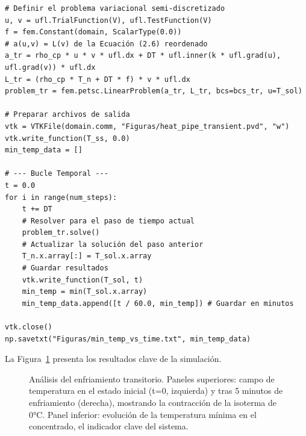 \begin{codelisting}[h!]
\begin{verbatim}
# Definir el problema variacional semi-discretizado
u, v = ufl.TrialFunction(V), ufl.TestFunction(V)
f = fem.Constant(domain, ScalarType(0.0))
# a(u,v) = L(v) de la Ecuación (2.6) reordenado
a_tr = rho_cp * u * v * ufl.dx + DT * ufl.inner(k * ufl.grad(u), ufl.grad(v)) * ufl.dx
L_tr = (rho_cp * T_n + DT * f) * v * ufl.dx
problem_tr = fem.petsc.LinearProblem(a_tr, L_tr, bcs=bcs_tr, u=T_sol)

# Preparar archivos de salida
vtk = VTKFile(domain.comm, "Figuras/heat_pipe_transient.pvd", "w")
vtk.write_function(T_ss, 0.0)
min_temp_data = []

# --- Bucle Temporal ---
t = 0.0
for i in range(num_steps):
    t += DT
    # Resolver para el paso de tiempo actual
    problem_tr.solve()
    # Actualizar la solución del paso anterior
    T_n.x.array[:] = T_sol.x.array
    # Guardar resultados
    vtk.write_function(T_sol, t)
    min_temp = min(T_sol.x.array)
    min_temp_data.append([t / 60.0, min_temp]) # Guardar en minutos

vtk.close()
np.savetxt("Figuras/min_temp_vs_time.txt", min_temp_data)
\end{verbatim}
\caption{Script de FEniCSx para resolver el problema de enfriamiento transitorio.}
\label{lst:heat-pipe-code}
\end{codelisting}

La Figura~\ref{fig:heat-pipe-result} presenta los resultados clave de la simulación.

\begin{figure}[h!]
    \centering
    \caption{Análisis del enfriamiento transitorio. Paneles superiores: campo de temperatura en el estado inicial (t=0, izquierda) y tras 5 minutos de enfriamiento (derecha), mostrando la contracción de la isoterma de 0°C. Panel inferior: evolución de la temperatura mínima en el concentrado, el indicador clave del sistema.}
    \label{fig:heat-pipe-result}
\end{figure}

